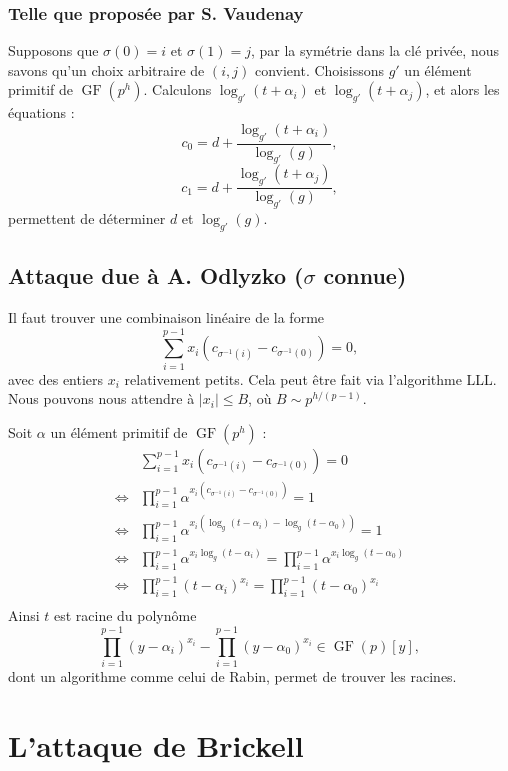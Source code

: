 \documentclass[a4paper, titlepage]{article}
\theoremstyle{definition}
\theoremstyle{remark}
\def\gf{\operatorname{GF}}
\begin{document}
\subsubsection{Telle que proposée par S. Vaudenay}
Supposons que $\sigma(0) = i$ et $\sigma(1) = j$, par la symétrie dans la clé privée, nous savons qu'un choix arbitraire de $(i,j)$ convient. Choisissons $g'$ un élément primitif de $\gf(p^h)$. Calculons $\log_{g'}(t+\alpha_i)$ et $\log_{g'}(t+\alpha_j)$, et alors les équations :
$$c_0 = d + \frac{\log_{g'}(t+\alpha_i)}{\log_{g'}(g)},$$
$$c_1 = d + \frac{\log_{g'}(t+\alpha_j)}{\log_{g'}(g)},$$
permettent de déterminer $d$ et $\log_{g'}(g)$. 

\subsection{Attaque due à A. Odlyzko ($\sigma$ connue)}

Il faut trouver une combinaison linéaire de la forme 
$$\sum_{i=1}^{p-1} x_i\left(c_{\sigma^{-1}(i)}-c_{\sigma^{-1}(0)}\right) = 0,$$
avec des entiers $x_i$ relativement petits. Cela peut être fait via l'algorithme LLL. Nous pouvons nous attendre à $|x_i| \leqslant B$, où $B \sim p^{h/(p-1)}$. 

Soit $\alpha$ un élément primitif de $\gf(p^h)$ :
\begin{align*}
& \sum_{i=1}^{p-1} x_i\left(c_{\sigma^{-1}(i)}-c_{\sigma^{-1}(0)}\right) = 0 \\
\Leftrightarrow & \prod_{i=1}^{p-1} \alpha^{x_i\left(c_{\sigma^{-1}(i)}-c_{\sigma^{-1}(0)}\right)} = 1 \\
\Leftrightarrow & \prod_{i=1}^{p-1} \alpha^{x_i(\log_g(t-\alpha_i)-\log_g(t-\alpha_0))} = 1 \\
\Leftrightarrow & \prod_{i=1}^{p-1} \alpha^{x_i\log_g(t-\alpha_i)} = \prod_{i=1}^{p-1} \alpha^{x_i\log_g(t-\alpha_0)}\\
\Leftrightarrow & \prod_{i=1}^{p-1} (t-\alpha_i)^{x_i} = \prod_{i=1}^{p-1} (t-\alpha_0)^{x_i}\\
\end{align*}
Ainsi $t$ est racine du polynôme
$$\prod_{i=1}^{p-1} (y-\alpha_i)^{x_i} - \prod_{i=1}^{p-1} (y-\alpha_0)^{x_i} \in \gf(p)[y],$$
dont un algorithme comme celui de Rabin,  permet de trouver les racines.

\section{L'attaque de Brickell}
\end{document}
